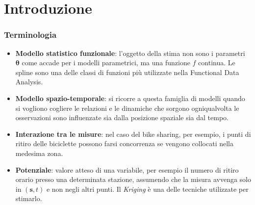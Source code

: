 \section{Introduzione}

\begin{frame}
	\frametitle{Terminologia}
	\centering
	
	\begin{itemize}
		\justifying
		\item \textbf{Modello statistico funzionale}: l'oggetto della stima non sono i parametri $\boldsymbol{\theta}$ come accade per i modelli parametrici, ma una funzione $f$ continua. Le spline sono una delle classi di funzioni più utilizzate nella Functional Data Analysis.
		\item \textbf{Modello spazio-temporale}: si ricorre a questa famiglia di modelli quando si vogliono cogliere le relazioni e le dinamiche che sorgono ogniqualvolta le osservazioni sono influenzate sia dalla posizione spaziale sia dal tempo.
		\item \textbf{Interazione tra le misure}: nel caso del bike sharing, per esempio, i punti di ritiro delle biciclette possono farsi concorrenza se vengono collocati nella medesima zona.
		\item \textbf{Potenziale}: valore atteso di una variabile, per esempio il numero di ritiro orario presso una determinata stazione, assumendo che la misura avvenga solo in $(\mathbf{s}, t)$ e non negli altri punti. Il \textit{Kriging} è una delle tecniche utilizzate per stimarlo.
	\end{itemize}
	
\end{frame}

